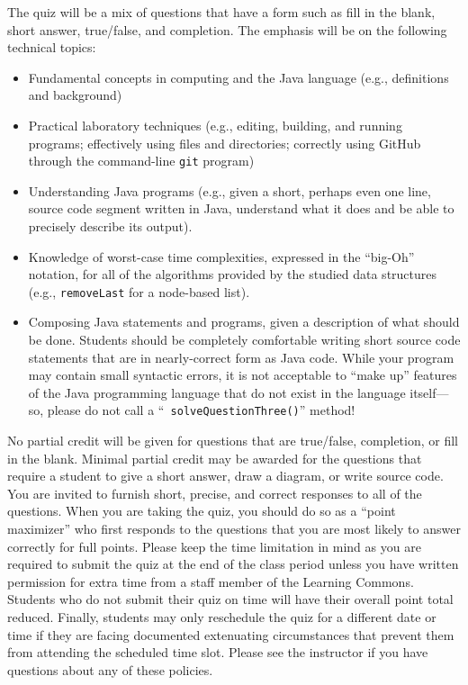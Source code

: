 \documentclass[11pt]{article}
\newcommand{\program}[1]{\lstinline{#1}}
\begin{document}
\noindent The quiz will be a mix of questions that have a form such as fill in
the blank, short answer, true/false, and completion. The emphasis will be on the
following technical topics:

\vspace*{-.05in}
\begin{itemize}

  \itemsep 0in

  \item Fundamental concepts in computing and the Java language (e.g.,
    definitions and background)

  \item Practical laboratory techniques (e.g., editing, building, and running
    programs; effectively using files and directories; correctly using GitHub
    through the command-line {\tt git} program)

  \item Understanding Java programs (e.g., given a short, perhaps even one line,
    source code segment written in Java, understand what it does and be able to
    precisely describe its output).

  \item Knowledge of worst-case time complexities, expressed in the ``big-Oh''
    notation, for all of the algorithms provided by the studied data structures
    (e.g., \program{removeLast} for a node-based list).

  \item Composing Java statements and programs, given a description of what
    should be done. Students should be completely comfortable writing short
    source code statements that are in nearly-correct form as Java code. While
    your program may contain small syntactic errors, it is not acceptable to
    ``make up'' features of the Java programming language that do not exist in
    the language itself---so, please do not call a ``{\tt
    solveQuestionThree()}'' method!

\end{itemize}

\noindent No partial credit will be given for questions that are true/false,
completion, or fill in the blank. Minimal partial credit may be awarded for the
questions that require a student to give a short answer, draw a diagram, or
write source code. You are invited to furnish short, precise, and correct
responses to all of the questions. When you are taking the quiz, you should do
so as a ``point maximizer'' who first responds to the questions that you are
most likely to answer correctly for full points. Please keep the time limitation
in mind as you are required to submit the quiz at the end of the class period
unless you have written permission for extra time from a staff member of the
Learning Commons. Students who do not submit their quiz on time will have their
overall point total reduced. Finally, students may only reschedule the quiz for
a different date or time if they are facing documented extenuating circumstances
that prevent them from attending the scheduled time slot. Please see the
instructor if you have questions about any of these policies.
\end{document}
